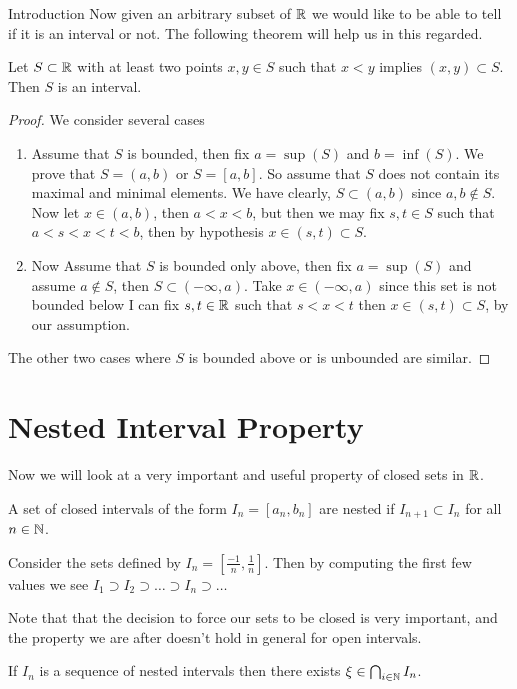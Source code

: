 \begin{chapter}{Introduction}
    Now given an arbitrary subset of $\mathbb{R}$ we would like to be able to tell if it is an interval or not. The following theorem will 
    help us in this regarded.  
    
    \begin{thm}
        Let $S \subset \mathbb{R}$ with at least two points $x, y \in S$ such that $x < y$ implies $(x, y) \subset S$.
        Then $S$ is an interval.  
    \end{thm}

    
    \begin{proof}
        We consider several cases 
        
        \begin{enumerate}
            \item Assume that $S$ is bounded, then fix $a = \sup(S)$ and $b = \inf(S)$. We prove that $S = (a, b)$ or $S = [a, b]$. So assume that $S$ does not contain its maximal and minimal elements. We have clearly, $S \subset (a, b)$ since $a, b \notin S$. 
                    Now let $x \in (a, b)$, then $a < x < b$, but then we may fix $s, t \in S$ such that $a < s < x < t < b$, then by hypothesis $x \in (s, t) \subset S$.
            \item Now Assume that $S$ is bounded only above, then fix $a = \sup(S)$ and assume $a \notin S$, then $S \subset (-\infty, a)$. 
            Take $x \in (-\infty, a)$ since this set is not bounded below I can fix $s, t \in \mathbb{R}$ such that $s < x < t$ then $x \in (s, t) \subset S$, by our assumption. 
        \end{enumerate}
        The other two cases where $S$ is bounded above or is unbounded are similar. 
    \end{proof}

    \section{Nested Interval Property}
    Now we will look at a very important and useful property of closed sets in $\mathbb{R}$. 

    
    \begin{defn}
        A set of closed intervals of the form $I_n = [a_n, b_n]$ are nested if $I_{n+1} \subset I_n$ for all $n \in \mathbb{N}$. 
    \end{defn}
    
    
    \begin{ex}
        Consider the sets defined by $I_n = [\frac{-1}{n}, \frac{1}{n}]$. Then by computing the first few values we see 
        $I_1 \supset I_2 \supset \dots \supset I_n \supset \dots $
    \end{ex}
    Note that that the decision to force our sets to be closed is very important, and the property we are after doesn't hold in general for open intervals. 
    \begin{thm}
    If $I_n$ is a sequence of nested intervals then there exists $\xi \in \bigcap_{i \in \mathbb{N}}I_n$. 
    \end{thm}


\end{chapter}
